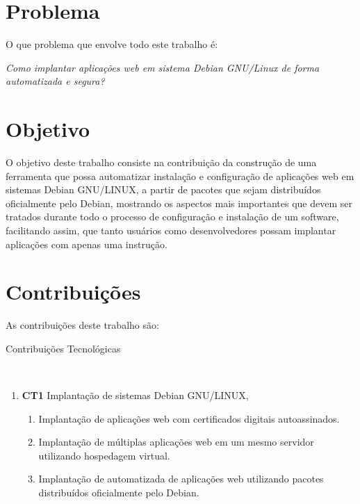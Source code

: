 \section{Problema}

O que problema que envolve todo este trabalho é:

\begin{center}
  \textit{
  Como implantar aplicações web em sistema Debian GNU/Linux de forma automatizada
  e segura?
}
\end{center}

\section{Objetivo}

O objetivo deste trabalho consiste na contribuição da construção de uma ferramenta
que possa automatizar instalação e configuração de aplicações web em sistemas
Debian GNU/LINUX, a partir de pacotes que sejam distribuídos oficialmente pelo
Debian, mostrando os aspectos mais importantes que devem ser tratados durante
todo o processo de configuração e instalação de um software, facilitando assim, que
tanto usuários como desenvolvedores possam implantar aplicações com apenas uma
instrução.

\section{Contribuições}

As contribuições deste trabalho são:

\begin{description}
  \item [Contribuições Tecnológicas]\
\end{description}
    \begin{enumerate}
      \item \textbf{CT1} Implantação de sistemas Debian GNU/LINUX,
        \begin{enumerate}
          \item Implantação de aplicações web com certificados digitais autoassinados.
          \item Implantação de múltiplas aplicações web em um mesmo servidor utilizando
          hospedagem virtual.
          \item Implantação de automatizada de aplicações web utilizando pacotes
          distribuídos oficialmente pelo Debian.
        \end{enumerate}
    \end{enumerate}

